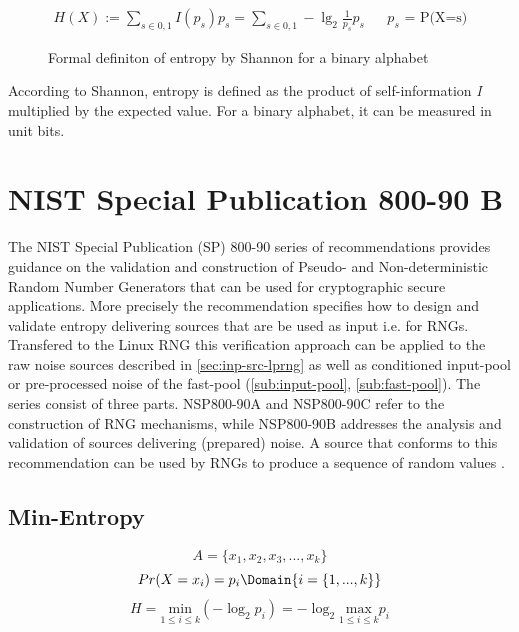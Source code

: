 \begin{figure}[H]
	\begin{align*}
	\displaystyle H(X) := \sum_{s \in {0,1}} I(p_s) p_s = \sum_{s \in {0,1}} -\lg_2 \frac{1}{p_s} p_s && \text{$p_s$ = P(X=s)}
	\end{align*}
	\caption{Formal definiton of entropy by Shannon for a binary alphabet}
	\label{fig:form-entropy-shan}
\end{figure}
According to Shannon, entropy is defined as the product of self-information \textit{I} multiplied by the expected value. For a binary alphabet, it can be measured in unit bits. 



\section{NIST Special Publication 800-90 B}

The NIST Special Publication (SP) 800-90 series of recommendations provides 
guidance on the validation and construction of Pseudo- and Non-deterministic Random Number Generators that can be used for cryptographic secure applications. More precisely the recommendation specifies how to design and validate entropy delivering sources that are be used as input i.e. for RNGs. Transfered to the Linux RNG this verification approach can be applied to the raw noise sources described in \ref{sec:inp-src-lprng} as well as conditioned input-pool or pre-processed noise of the  
fast-pool (\ref{sub:input-pool}, \ref{sub:fast-pool}). The series consist of three parts. NSP800-90A and NSP800-90C refer to the construction of RNG mechanisms, while NSP800-90B addresses the analysis and validation of sources delivering (prepared) noise. A source that conforms to this recommendation can be used by RNGs to produce a sequence of random values \cite{rukhin2010nist}.

\subsection{Min-Entropy}

\begin{equation}
	A = \{x_1, x_2, x_3, ..., x_k\}
	\label{eq:min-ent-A}
\end{equation}
\begin{equation}
	Pr(X=x_i) = p_i 
	\Domain{i=\{1,...,k\}}
\end{equation}
\begin{equation}
	H = \underset{1\leq i\leq k}{\mathrm{min}}(-\log_2p_i) = -\log_2 \underset{1\leq i\leq k}{\mathrm{max}}p_i
\end{equation}




